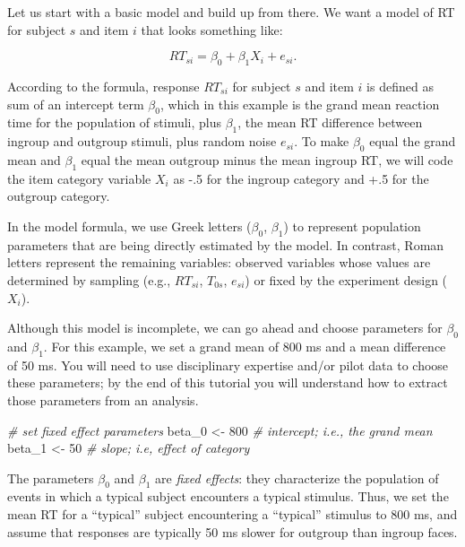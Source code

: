 \documentclass[
  english,
  doc,floatsintext]{apa6}
\newenvironment{Shaded}{\begin{snugshade}}{\end{snugshade}}
\newcommand{\CommentTok}[1]{\textcolor[rgb]{0.56,0.35,0.01}{\textit{#1}}}
\newcommand{\DecValTok}[1]{\textcolor[rgb]{0.00,0.00,0.81}{#1}}
\newcommand{\NormalTok}[1]{#1}
\newcommand{\StringTok}[1]{\textcolor[rgb]{0.31,0.60,0.02}{#1}}
\begin{document}
Let us start with a basic model and build up from there. We want a model of RT for subject \(s\) and item \(i\) that looks something like:

\begin{equation}
RT_{si} = \beta_0 + \beta_1 X_{i} + e_{si}.
\end{equation}

\noindent According to the formula, response \(RT_{si}\) for subject \(s\) and item \(i\) is defined as sum of an intercept term \(\beta_0\), which in this example is the grand mean reaction time for the population of stimuli, plus \(\beta_1\), the mean RT difference between ingroup and outgroup stimuli, plus random noise \(e_{si}\). To make \(\beta_0\) equal the grand mean and \(\beta_1\) equal the mean outgroup minus the mean ingroup RT, we will code the item category variable \(X_{i}\) as -.5 for the ingroup category and +.5 for the outgroup category.

In the model formula, we use Greek letters (\(\beta_0\), \(\beta_1\)) to represent population parameters that are being directly estimated by the model. In contrast, Roman letters represent the remaining variables: observed variables whose values are determined by sampling (e.g., \(RT_{si}\), \(T_{0s}\), \(e_{si}\)) or fixed by the experiment design (\(X_i\)).

Although this model is incomplete, we can go ahead and choose parameters for \(\beta_0\) and \(\beta_1\). For this example, we set a grand mean of 800 ms and a mean difference of 50 ms. You will need to use disciplinary expertise and/or pilot data to choose these parameters; by the end of this tutorial you will understand how to extract those parameters from an analysis.

\begin{Shaded}
\begin{Highlighting}[]
\CommentTok{# set fixed effect parameters}
\NormalTok{beta_}\DecValTok{0}\NormalTok{ <-}\StringTok{ }\DecValTok{800} \CommentTok{# intercept; i.e., the grand mean}
\NormalTok{beta_}\DecValTok{1}\NormalTok{ <-}\StringTok{  }\DecValTok{50} \CommentTok{# slope; i.e, effect of category}
\end{Highlighting}
\end{Shaded}

\noindent The parameters \(\beta_0\) and \(\beta_1\) are \emph{fixed effects}: they characterize the population of events in which a typical subject encounters a typical stimulus. Thus, we set the mean RT for a \enquote{typical} subject encountering a \enquote{typical} stimulus to 800 ms, and assume that responses are typically 50 ms slower for outgroup than ingroup faces.
\end{document}
